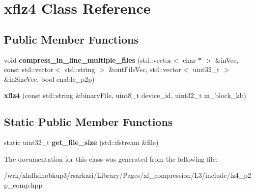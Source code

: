 \hypertarget{classxflz4}{\section{xflz4 Class Reference}
\label{classxflz4}
}
\subsection*{Public Member Functions}
\begin{DoxyCompactItemize}
\item 
\hypertarget{classxflz4_a9e27dafab06458253ea566cc183e5737}{void {\bfseries compress\-\_\-in\-\_\-line\-\_\-multiple\-\_\-files} (std\-::vector$<$ char $\ast$ $>$ \&in\-Vec, const std\-::vector$<$ std\-::string $>$ \&out\-File\-Vec, std\-::vector$<$ uint32\-\_\-t $>$ \&in\-Size\-Vec, bool enable\-\_\-p2p)}\label{classxflz4_a9e27dafab06458253ea566cc183e5737}

\item 
\hypertarget{classxflz4_a3e9f8190e723a3aa1f1316177f338370}{{\bfseries xflz4} (const std\-::string \&binary\-File, uint8\-\_\-t device\-\_\-id, uint32\-\_\-t m\-\_\-block\-\_\-kb)}\label{classxflz4_a3e9f8190e723a3aa1f1316177f338370}

\end{DoxyCompactItemize}
\subsection*{Static Public Member Functions}
\begin{DoxyCompactItemize}
\item 
\hypertarget{classxflz4_a8465dc5a5784b38586c66f78c3791d90}{static uint32\-\_\-t {\bfseries get\-\_\-file\-\_\-size} (std\-::ifstream \&file)}\label{classxflz4_a8465dc5a5784b38586c66f78c3791d90}

\end{DoxyCompactItemize}


The documentation for this class was generated from the following file\-:\begin{DoxyCompactItemize}
\item 
/wrk/xhdhdnobkup3/rsarkari/\-Library/\-Pages/xf\-\_\-compression/\-L3/include/lz4\-\_\-p2p\-\_\-comp.\-hpp\end{DoxyCompactItemize}
